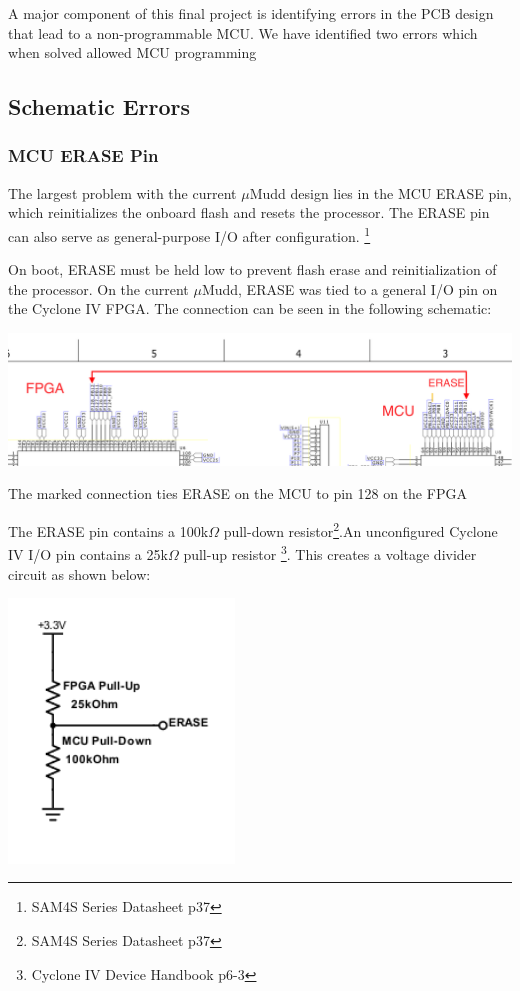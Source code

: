 \documentclass[12pt]{article}
\begin{document}
A major component of this final project is identifying errors in the PCB design that lead to a non-programmable MCU. We have identified two errors which when solved allowed MCU programming

\subsection{Schematic Errors}

\subsubsection{MCU ERASE Pin}
The largest problem with the current $\mu$Mudd design lies in the MCU ERASE pin, which reinitializes the onboard flash and resets the processor. The ERASE pin can also serve as general-purpose I/O after configuration. \footnote{SAM4S Series Datasheet p37}

On boot, ERASE must be held low to prevent flash erase and reinitialization of the processor. On the current $\mu$Mudd, ERASE was tied to a general I/O pin on the Cyclone IV FPGA. The connection can be seen in the following schematic:

\begin{center}
	\includegraphics[width=16cm]{erase_error.png}
	\caption{The marked connection ties ERASE on the MCU to pin 128 on the FPGA}
\end{center}

The ERASE pin contains a 100k$\Omega$ pull-down resistor\footnote{SAM4S Series Datasheet p37}.An unconfigured Cyclone IV I/O pin contains a 25k$\Omega$ pull-up resistor \footnote{Cyclone IV Device Handbook p6-3}. This creates a voltage divider circuit as shown below:

\begin{center}
	\includegraphics[width=6cm]{resistor_divider.png}
\end{center}
\end{document}
